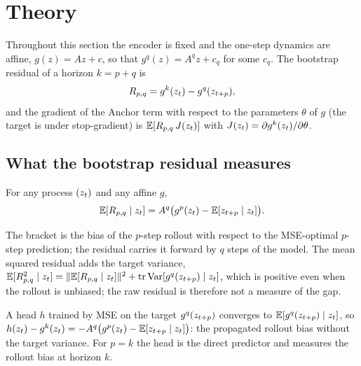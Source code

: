 \section{Theory}
\label{sec:theory}

Throughout this section the encoder is fixed and the one-step dynamics are affine, $g(z) = A z + c$, so that $g^{q}(z) = A^{q} z + c_q$ for some $c_q$. The bootstrap residual of a horizon $k = p + q$ is
\begin{equation}
  R_{p,q} = g^{k}(z_{t}) - g^{q}(z_{t+p}),
\end{equation}
and the gradient of the Anchor term with respect to the parameters $\theta$ of $g$ (the target is under stop-gradient) is $\mathbb{E}[R_{p,q} \, J(z_{t})]$ with $J(z_{t}) = \partial g^{k}(z_{t}) / \partial \theta$.

\subsection{What the bootstrap residual measures}

\begin{lemma}
\label{lem:residual}
For any process $(z_{t})$ and any affine $g$,
\begin{equation}
  \mathbb{E}[R_{p,q} \mid z_{t}] = A^{q} \big( g^{p}(z_{t}) - \mathbb{E}[z_{t+p} \mid z_{t}] \big).
\end{equation}
\end{lemma}

The bracket is the bias of the $p$-step rollout with respect to the MSE-optimal $p$-step prediction; the residual carries it forward by $q$ steps of the model. The mean squared residual adds the target variance, $\mathbb{E}[R_{p,q}^2 \mid z_{t}] = \|\mathbb{E}[R_{p,q} \mid z_{t}]\|^2 + \operatorname{tr}\operatorname{Var}[g^{q}(z_{t+p}) \mid z_{t}]$, which is positive even when the rollout is unbiased; the raw residual is therefore not a measure of the gap.

\begin{corollary}[Critic]
\label{cor:critic}
A head $h$ trained by MSE on the target $g^{q}(z_{t+p})$ converges to $\mathbb{E}[g^{q}(z_{t+p}) \mid z_{t}]$, so $h(z_{t}) - g^{k}(z_{t}) = -A^{q}\big(g^{p}(z_{t}) - \mathbb{E}[z_{t+p} \mid z_{t}]\big)$: the propagated rollout bias without the target variance. For $p = k$ the head is the direct predictor and measures the rollout bias at horizon $k$.
\end{corollary}

